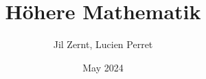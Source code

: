 \documentclass[a4paper, fontsize = 8pt, landscape]{scrartcl}
\title{Höhere Mathematik}
\author{Jil Zernt, Lucien Perret}
\date{May 2024}
\begin{document}
\begin{multicols}{3}
	\thispagestyle{TitlePageStyle}
	\maketitle
	\raggedcolumns
\end{multicols}
\end{document}
